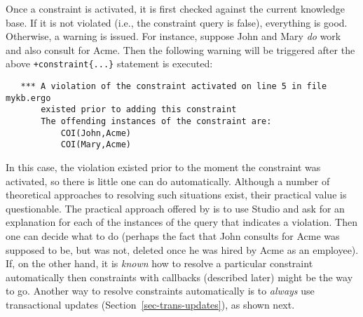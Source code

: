 Once a constraint is activated, it is first checked against the current
knowledge base. If it is not violated (i.e., the constraint
query is false), everything is good. Otherwise, a
warning is issued. For instance, suppose John and Mary \emph{do}
work and also consult for
Acme. Then the following warning will be triggered after the above
\texttt{+constraint\{...\}} statement is executed: 
\begin{verbatim}
   *** A violation of the constraint activated on line 5 in file mykb.ergo 
       existed prior to adding this constraint
       The offending instances of the constraint are:
           COI(John,Acme)
           COI(Mary,Acme)
\end{verbatim}
In this case, the violation existed prior to the moment the constraint was
activated, so there is little one can do automatically. Although a number of
theoretical
approaches to resolving such situations exist, their practical value is
questionable.  The practical approach offered by \ERGO is to use Studio and
ask for an explanation for each of the instances of the query that
indicates a violation. Then one can decide what to do (perhaps the
fact that John consults for Acme was supposed to be, but was not,
deleted once he was hired by Acme as an employee).
If, on the other hand, it is \emph{known} how to resolve
a particular constraint automatically then constraints with callbacks
(described later) might be the way to go.
Another way to resolve constraints automatically is to \emph{always} use
transactional updates (Section~\ref{sec-trans-updates}), as shown next. 

